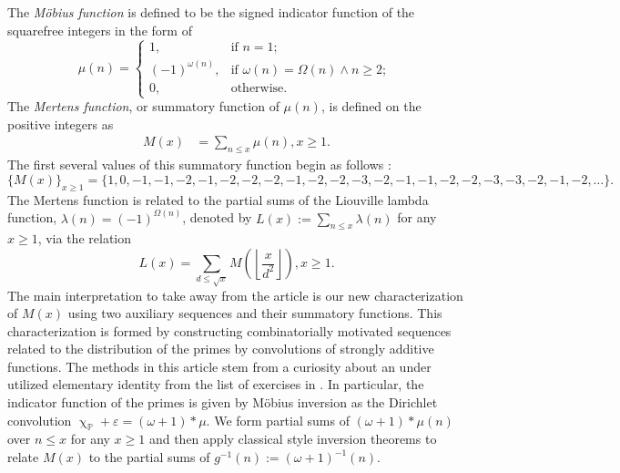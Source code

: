 \documentclass[11pt,reqno,a4letter]{article}
\numberwithin{figure}{section}
\numberwithin{table}{section}
\newcommand{\cf}{\textit{cf.\ }}
\newcommand{\seqnum}[1]{\href{http://oeis.org/#1}{\color{ProcessBlue}{\underline{#1}}}}
\renewcommand{\chi}{\upchi}
\newcommand{\Floor}[2]{\ensuremath{\left\lfloor \frac{#1}{#2} \right\rfloor}}
\theoremstyle{plain}
\numberwithin{theorem}{section}
\theoremstyle{definition}
\begin{document}
The \emph{M\"obius function} is defined to be the signed indicator function 
of the squarefree integers in the form of \cite[\seqnum{A008683}]{OEIS} 
\[
\mu(n) = \begin{cases} 
     1, & \text{if $n = 1$; } \\ 
     (-1)^{\omega(n)}, & \text{if $\omega(n) = \Omega(n) \wedge n \geq 2$; } \\ 
     0, & \text{otherwise.} 
     \end{cases} 
\]
The \emph{Mertens function}, or summatory function of $\mu(n)$, is defined on the 
positive integers as 
\begin{align*} 
M(x) & = \sum_{n \leq x} \mu(n), x \geq 1. 
\end{align*} 
The first several values of this 
summatory function begin as follows \cite[\seqnum{A002321}]{OEIS}: 
\[
\{M(x)\}_{x \geq 1} = \{1, 0, -1, -1, -2, -1, -2, -2, -2, -1, -2, -2, -3, -2, 
     -1, -1, -2, -2, -3, -3, -2, -1, -2, \ldots\}. 
\] 
The Mertens function is related 
to the partial sums of the Liouville lambda function, 
$\lambda(n) = (-1)^{\Omega(n)}$, 
denoted by $L(x) := \sum_{n \leq x} \lambda(n)$ 
for any $x \geq 1$, via the relation \cite{HUMPHRIES-JNT-2013,LEHMAN-1960} 
\[
L(x) = \sum_{d \leq \sqrt{x}} M\left(\Floor{x}{d^2}\right), x \geq 1. 
\] 
The main interpretation to take away from the article is 
our new characterization of $M(x)$ using two auxiliary sequences and their 
summatory functions. This characterization is formed by constructing 
combinatorially motivated sequences related to the distribution of the primes 
by convolutions of strongly additive functions. 
The methods in this article stem from a 
curiosity about an under utilized elementary identity from 
the list of exercises in \cite[\S 2; \cf \S 11]{APOSTOLANUMT}. 
In particular, the indicator function of the primes is given by M\"obius inversion as the 
Dirichlet convolution $\chi_{\mathbb{P}} + \varepsilon = (\omega + 1) \ast \mu$. 
We form partial sums of $(\omega + 1) \ast \mu(n)$ over $n \leq x$ for 
any $x \geq 1$ and then apply classical style inversion theorems to relate  
$M(x)$ to the partial sums of $g^{-1}(n) := (\omega+1)^{-1}(n)$. 
\end{document}
